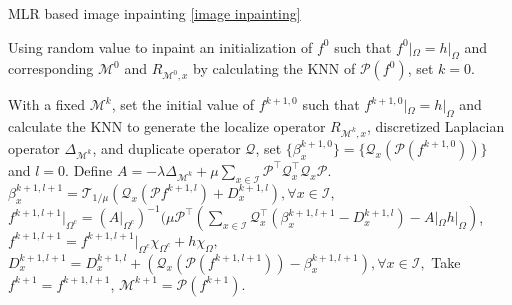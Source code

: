 \documentclass[letterpaper,10pt]{article}
\newcommand{\RLC}[1]{\textcolor{blue}{RL: #1}}
\begin{document}
\begin{algorithm}

\caption{MLR based image inpainting \eqref{image inpainting}}
\label{alg:Inpainting}
\begin{algorithmic}
 Using random value to inpaint an initialization of $f^0$ such that $f^0|_\Omega = h|_\Omega$ and corresponding $\mathcal{M}^0$ and $R_{\mathcal{M}^0,x}$ by calculating the KNN of $\mathcal{P}(f^0)$, set $k=0$.

 With a fixed $\mathcal{M}^k$, set the initial value of $f^{k+1,0}$ such that $f^{k+1,0}|_\Omega = h|_\Omega$ and calculate the KNN to generate the localize operator $R_{\mathcal{M}^k,x}$, discretized Laplacian operator $\Delta_{\mathcal{M}^k}$, and duplicate operator $\mathcal{Q}$, set $\{\beta_x^{k+1,0}\} = \{\mathcal{Q}_x (\mathcal{P} (f^{k+1,0}))\}$ and $l=0$. Define $A = - \lambda \Delta_{\mathcal{M}^k}  + \mu \sum\limits_{x \in \mathscr{I}} \mathcal{P}^{\top}\mathcal{Q}_x^{\top}\mathcal{Q}_x \mathcal{P}$.
 $\beta_x^{k+1,l+1} = \mathcal{T}_{1/\mu} (\mathcal{Q}_x (\mathcal{P} f^{k+1,l}) +D_x^{k+1,l}), \forall x \in \mathscr{I},$
 $f^{k+1,l+1}|_{\Omega^c} =  (A|_{\Omega^c})^{-1} (\mu \mathcal{P}^{\top} ( \sum\limits_{x \in \mathscr{I}}  \mathcal{Q}_x^{\top}( {\beta}_x^{k+1,l+1} -D_x^{k+1,l}) - A|_\Omega h|_\Omega)$,
 $f^{k+1,l+1} = f^{k+1,l+1}|_{\Omega^c} \chi_{\Omega^c} + h \chi_{\Omega},$
 $D_{x}^{k+1,l+1} = D_{x}^{k+1,l} + (\mathcal{Q}_x(\mathcal{P}(f^{k+1,l+1}))-\beta_x^{k+1,l+1}), \forall x \in \mathscr{I},$
\ENDWHILE
{} Take $f^{k+1} = f^{k+1,l+1}$,
 $\mathcal{M}^{k+1} = \mathcal{P}(f^{k+1})$.
\ENDWHILE

\end{algorithmic}
\end{algorithm}
\end{document}
